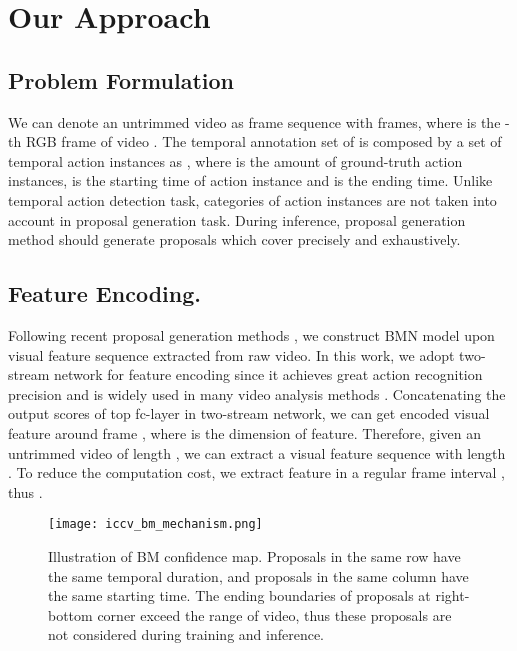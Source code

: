\documentclass[10pt,twocolumn,letterpaper]{article}
\begin{document}
\section{Our Approach}

\subsection{Problem Formulation}

We can denote an untrimmed video  as frame sequence  with   frames, where  is the -th RGB frame of video .
The temporal annotation set of  is composed by
a set of temporal action instances as  , where  is the amount of ground-truth action instances,   is the starting time of action instance  and  is the ending time.
Unlike temporal action detection task, categories of action instances are not taken into account in proposal generation task.
During inference, proposal generation method should generate proposals  which cover  precisely and exhaustively.


\subsection{Feature Encoding.}

Following recent proposal generation methods \cite{sst_buch_cvpr17, escorcia2016daps, gao2017turn,lin2018bsn}, we construct BMN model upon visual feature sequence extracted from raw video. 
In this work, we adopt two-stream network \cite{simonyan2014two} for feature encoding since it achieves great action recognition precision and is widely used in many video analysis methods \cite{gao2017cascaded,ssad,zhao2017temporal}.
Concatenating the output scores of top fc-layer in two-stream network, we can get encoded visual feature  around frame , where  is the dimension of feature.
Therefore, given an untrimmed video  of length , we can extract a visual feature sequence  with length .
To reduce the computation cost, we extract feature in a regular frame interval , thus .


\begin{figure}[t]
\begin{center}
\begin{minipage}[b]{1.0\linewidth}
  \centering
  \centerline{\texttt{[image: iccv\_bm\_mechanism.png]}}
  \medskip
\end{minipage}
\end{center}
   \caption{Illustration of BM confidence map. Proposals in the same row have the same temporal duration, and proposals in the same column have the same starting time. The ending boundaries of proposals at right-bottom corner exceed the range of  video, thus these proposals are not considered during training and inference.}
\label{fig:bm_mechanism}
\end{figure}
\end{document}
